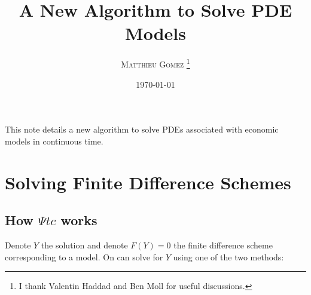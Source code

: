 \documentclass[english]{article}
\begin{document}
\title{A New Algorithm to Solve PDE Models}
\author{\large{\textsc{Matthieu Gomez \thanks{I thank Valentin Haddad and Ben Moll for useful discussions.}}}}
\date{\today}
\maketitle
This note details a new algorithm to solve PDEs associated with economic models in continuous time.

\section{Solving Finite Difference Schemes}

\subsection{How $\Psi tc$ works}
Denote $Y$  the solution and denote $F(Y) = 0$ the finite difference scheme corresponding to a model. On can solve for $Y$ using one of the two methods:
\end{document}
